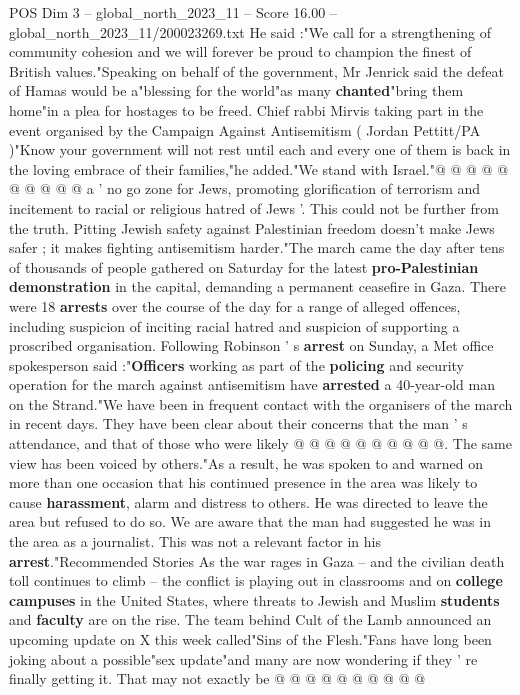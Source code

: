 \begin{textsample}{POS Dim 3 – global\_north\_2023\_11 – Score 16.00 – global\_north\_2023\_11/200023269.txt}
He said :"We call for a strengthening of community cohesion and we will forever be proud to champion the finest of British values."Speaking on behalf of the government, Mr Jenrick said the defeat of Hamas would be a"blessing for the world"as many \textbf{chanted}"bring them home"in a plea for hostages to be freed.
Chief rabbi Mirvis taking part in the event organised by the Campaign Against Antisemitism ( Jordan Pettitt/PA )"Know your government will not rest until each and every one of them is back in the loving embrace of their families,"he added."We stand with Israel."@ @ @ @ @ @ @ @ @ @ a ' no go zone for Jews, promoting glorification of terrorism and incitement to racial or religious hatred of Jews '.
This could not be further from the truth.
Pitting Jewish safety against Palestinian freedom doesn't make Jews safer ; it makes fighting antisemitism harder."The march came the day after tens of thousands of people gathered on Saturday for the latest \textbf{pro-Palestinian} \textbf{demonstration} in the capital, demanding a permanent ceasefire in Gaza.
There were 18 \textbf{arrests} over the course of the day for a range of alleged offences, including suspicion of inciting racial hatred and suspicion of supporting a proscribed organisation.
Following Robinson ' s \textbf{arrest} on Sunday, a Met office spokesperson said :"\textbf{Officers} working as part of the \textbf{policing} and security operation for the march against antisemitism have \textbf{arrested} a 40-year-old man on the Strand."We have been in frequent contact with the organisers of the march in recent days.
They have been clear about their concerns that the man ' s attendance, and that of those who were likely @ @ @ @ @ @ @ @ @ @.
The same view has been voiced by others."As a result, he was spoken to and warned on more than one occasion that his continued presence in the area was likely to cause \textbf{harassment}, alarm and distress to others.
He was directed to leave the area but refused to do so.
We are aware that the man had suggested he was in the area as a journalist.
This was not a relevant factor in his \textbf{arrest}."Recommended Stories As the war rages in Gaza -- and the civilian death toll continues to climb -- the conflict is playing out in classrooms and on \textbf{college} \textbf{campuses} in the United States, where threats to Jewish and Muslim \textbf{students} and \textbf{faculty} are on the rise.
The team behind Cult of the Lamb announced an upcoming update on X this week called"Sins of the Flesh."Fans have long been joking about a possible"sex update"and many are now wondering if they ' re finally getting it.
That may not exactly be @ @ @ @ @ @ @ @ @ @

\end{textsample}
